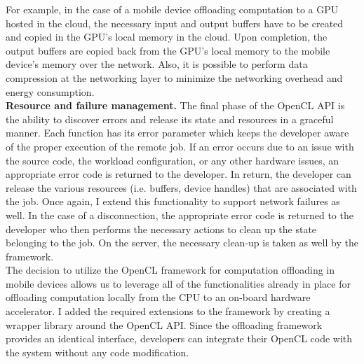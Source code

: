 %
For example, in the case of a mobile device offloading computation to a
GPU hosted in the cloud, the necessary input and output buffers have to
be created and copied in the GPU's local memory in the cloud.
%
Upon completion, the output buffers are copied back from the GPU's local
memory to the mobile device's memory over the network.
%
Also, it is possible to perform data compression at the networking layer
to minimize the networking overhead and energy consumption.\\
%
{\bf Resource and failure management.} The final phase of the OpenCL API
is the ability to discover errors and release its state and resources in
a graceful manner.
%
Each function has its error parameter which keeps the developer aware of
the proper execution of the remote job.
%
If an error occurs due to an issue with the source code, the workload
configuration, or any other hardware issues, an appropriate error code
is returned to the developer.
%
In return, the developer can release the various resources (i.e. buffers,
device handles) that are associated with the job.
%
Once again, I extend this functionality to support network failures as
well.
%
In the case of a disconnection, the appropriate error code is returned
to the developer who then performs the necessary actions to clean up the
state belonging to the job.
%
On the server, the necessary clean-up is taken as well by the
framework.\\
%
The decision to utilize the OpenCL framework for computation offloading
in mobile devices allows us to leverage all of the functionalities
already in place for offloading computation locally from the CPU to an
on-board hardware accelerator.
%
I added the required extensions to the framework by creating a wrapper
library around the OpenCL API.
%
Since the offloading framework provides an identical interface,
developers can integrate their OpenCL code with the system without any
code modification. 
%
